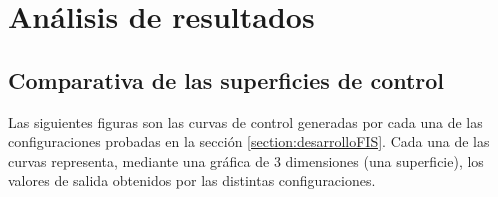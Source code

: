 \chapter{Análisis de resultados}


\section{Comparativa de las superficies de control}
Las siguientes figuras son las curvas de control generadas por cada una de las configuraciones probadas en la sección \ref{section:desarrolloFIS}. Cada una de las curvas representa, mediante una gráfica de 3 dimensiones (una superficie), los valores de salida obtenidos por las distintas configuraciones.

